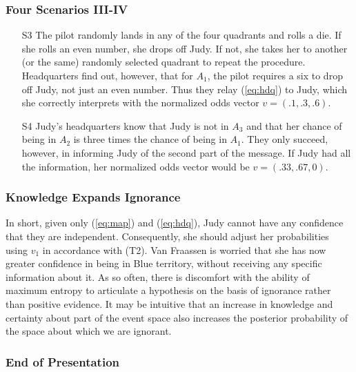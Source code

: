 \documentclass[xcolor=dvipsnames]{beamer}
\begin{document}
\begin{frame}
  \frametitle{Four Scenarios III-IV}
\begin{enumerate}
\item[S3] The pilot randomly lands in any of the four quadrants and
  rolls a die. If she rolls an even number, she drops off Judy. If
  not, she takes her to another (or the same) randomly selected
  quadrant to repeat the procedure. Headquarters find out, however,
  that for $A_{1}$, the pilot requires a six to drop off Judy, not
  just an even number. Thus they relay ({\ref{eq:hdq}}) to Judy, which
  she correctly interprets with the normalized odds vector
  $v=(.1,.3,.6)$.
\item [S4] Judy's headquarters know that Judy is not in $A_{3}$ and
  that her chance of being in $A_{2}$ is three times the chance of
  being in $A_{1}$. They only succeed, however, in informing Judy of
  the second part of the message. If Judy had all the information, her
  normalized odds vector would be $v=(.33,.67,0)$.
\end{enumerate}
\end{frame}

\begin{frame}
  \frametitle{Knowledge Expands Ignorance}
  In short, given only ({\ref{eq:map}}) and ({\ref{eq:hdq}}), Judy
  cannot have any confidence that they are independent. Consequently,
  she should adjust her probabilities using $v_{1}$ in accordance with
  (T2). Van Fraassen is worried that she has now greater confidence in
  being in Blue territory, without receiving any specific information
  about it. As so often, there is discomfort with the ability of
  maximum entropy to articulate a hypothesis on the basis of ignorance
  rather than positive evidence. It may be intuitive that an increase
  in knowledge and certainty about part of the event space also
  increases the posterior probability of the space about which we are
  ignorant.
\end{frame}

\begin{frame}
  \frametitle{End of Presentation}
\end{frame}
\end{document}
